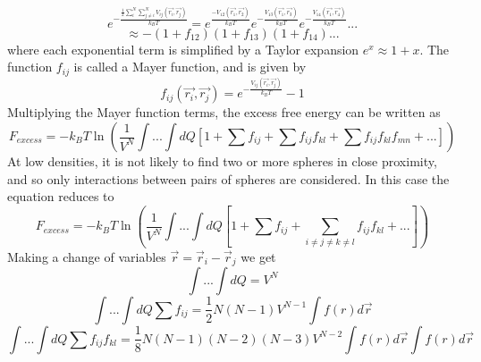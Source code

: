 \documentclass[12pt]{article}
\begin{document}
\begin{displaymath}{e^{-\frac{\frac{1}{2}\sum^N_i\sum^N_{j\neq{i}}V_{ij}(\vec{r_i},\vec{r_j})}{k_BT}}=e^{\frac{-V_{12}(\vec{r_1},\vec{r_2})}{k_BT}}e^{-\frac{V_{13}(\vec{r_1},\vec{r_3})}{k_BT}}e^{-\frac{V_{14}(\vec{r_1},\vec{r_4})}{k_BT}}...}\end{displaymath}    \begin{equation}{\approx-(1+f_{12})(1+f_{13})(1+f_{14})...}\end{equation}
where each exponential term is simplified by a Taylor expansion $e^x\approx{1+x}$. %
The function $f_{ij}$ is called a Mayer function, and is given by\begin{equation}{f_{ij}(\vec{r_i},\vec{r_j})=e^{-\frac{V_{ij}(\vec{r_i},\vec{r_j})}{k_BT}}-1}\end{equation} 
Multiplying the Mayer function terms, the excess free energy can be written as
\begin{equation}{F_{excess}=-k_BT\ln{\left(\frac{1}{V^N}\int{...}\int{dQ}\left[1 + \sum{f_{ij}} + \sum{f_{ij}f_{kl}} +\sum{f_{ij}f_{kl}f_{mn}} +... \right]\right)  }}\end{equation}
At low densities, it is not likely to find two or more spheres in close proximity, and so only interactions between pairs of spheres are considered. In this case the equation reduces to
\begin{equation}{F_{excess}=-k_BT\ln{\left(\frac{1}{V^N}\int{...}\int{dQ}\left[1 + \sum{f_{ij}} + \sum_{i\neq{j}\neq{k}\neq{l}}{f_{ij}f_{kl}} +... \right]\right)  }}\end{equation} 
Making a change of variables $\vec{r}=\vec{r}_i-\vec{r}_j $ we get \begin{equation}{\int{...}\int{dQ}=V^N}\end{equation}\begin{equation}{\int{...}\int{dQ}\sum{f_{ij}}=\frac{1}{2}N(N-1)V^{N-1}\int{f(r)}{d\vec{r}}}\end{equation} \begin{equation}{\int{...}\int{dQ}\sum{f_{ij}f_{kl}}=\frac{1}{8}N(N-1)(N-2)(N-3)V^{N-2}\int{f(r)}{d\vec{r}}\int{f(r)}{d\vec{r}}}\end{equation} 
\end{document}
